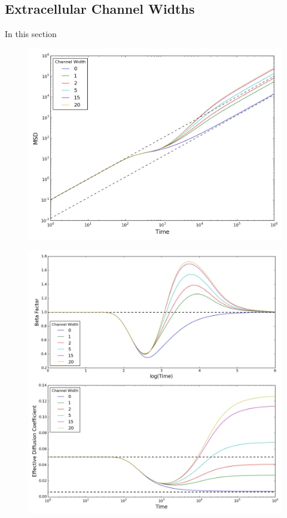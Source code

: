 \subsection{Extracellular Channel Widths}
\label{sec:2D-channel-width}
	In this section	
	\begin{figure}[h]
		\centering
		\includegraphics[width=1.0\linewidth]{../images/2D/ye_msd_2D}
		\caption{}
		\label{fig:ye_msd_2D}
	\end{figure}
	
	\begin{figure}[h]
		\centering
		\includegraphics[width=1.0\linewidth]{../images/2D/ye_beta_deff_2D}
		\caption{}
		\label{fig:ye_beta_deff_2D}
	\end{figure}

	
